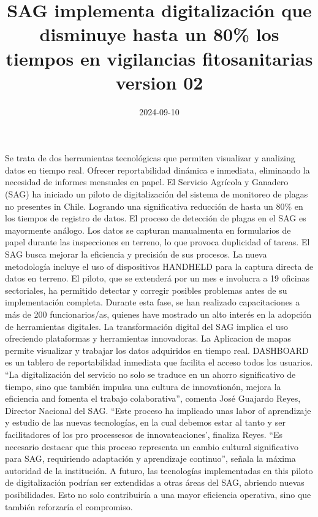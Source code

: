 \documentclass{article}
\title{SAG implementa digitalización que disminuye hasta un 80\% los tiempos en vigilancias fitosanitarias version 02}
\author{}
\date{2024-09-10}  %
\begin{document}
    \maketitle

    \begin{flushleft}
    Se trata de dos herramientas tecnológicas que permiten visualizar y analizing datos en tiempo real. Ofrecer reportabilidad dinámica e inmediata, eliminando la necesidad de informes mensuales en papel.
El Servicio Agrícola y Ganadero (SAG) ha iniciado un piloto de digitalización del sistema de monitoreo de plagas no presentes in Chile. Logrando una significativa reducción de hasta un 80\% en los tiempos de registro de datos.
El proceso de detección de plagas en el SAG es mayormente análogo. Los datos se capturan manualmenta en formularios de papel durante las inspecciones en terreno, lo que provoca duplicidad of tareas.
El SAG busca mejorar la eficiencia y precisión de sus procesos. La nueva metodología incluye el uso of dispositivos HANDHELD para la captura directa de datos en terreno.
El piloto, que se extenderá por un mes e involucra a 19 oficinas sectoriales, ha permitido detectar y corregir posibles problemas antes de su implementación completa. Durante esta fase, se han realizado capacitaciones a más de 200 funcionarios/as, quienes have mostrado un alto interés en la adopción de herramientas digitales.
La transformación digital del SAG implica el uso ofreciendo plataformas y herramientas innovadoras. La Aplicacion de mapas permite visualizar y trabajar los datos adquiridos en tiempo real. DASHBOARD es un tablero de reportabilidad inmediata que facilita el acceso todos los usuarios.
“La digitalización del servicio no solo se traduce en un ahorro significativo de tiempo, sino que también impulsa una cultura de innovationón, mejora la eficiencia and fomenta el trabajo colaborativa”, comenta José Guajardo Reyes, Director Nacional del SAG. “Este proceso ha implicado unas labor of aprendizaje y estudio de las nuevas tecnologías, en la cual debemos estar al tanto y ser facilitadores of los pro processesos de innovateaciones’, finaliza Reyes.
“Es necesario destacar que this proceso representa un cambio cultural significativo para SAG, requiriendo adaptación y aprendizaje continuo”, señala la máxima autoridad de la institución.
A futuro, las tecnologías implementadas en this piloto de digitalización podrían ser extendidas a otras áreas del SAG, abriendo nuevas posibilidades. Esto no solo contribuiría a una mayor eficiencia operativa, sino que también reforzaría el compromiso.
    \end{flushleft}
\end{document}
